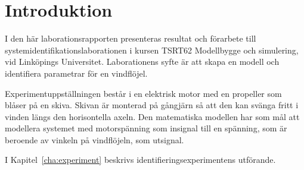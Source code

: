 \chapter{Introduktion}
\label{cha:introduktion}
I den här laborationsrapporten presenteras resultat och förarbete till
systemidentifikationslaborationen i kursen TSRT62 Modellbygge och
simulering, vid Linköpings Universitet. Laborationens syfte är att skapa
en modell och identifiera parametrar för en vindflöjel.

Experimentuppställningen består i en elektrisk motor med en propeller som
blåser på en skiva. Skivan är monterad på gångjärn så att den kan svänga
fritt i vinden längs den horisontella axeln. Den matematiska modellen har
som mål att modellera systemet med motorspänning som insignal till en
spänning, som är beroende av vinkeln på vindflöjeln, som utsignal.

I Kapitel~\ref{cha:experiment} beskrivs identifieringsexperimentens utförande.